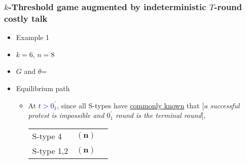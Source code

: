 \documentclass[9pt,handout]{beamer}
\begin{document}
\begin{frame}
  \frametitle{$k$-Threshold game augmented by indeterministic $T$-round costly talk}

\begin{itemize}
\item Example 1
\item $k=6$, $n=8$
\item $G$ and $\theta$=
\begin{center}
\end{center}
\end{itemize}

\begin{itemize}
\item Equilibrium path
\begin{itemize}
\item 
{
At \textcolor{blue}{$t>0^{'}_1$}, since all S-types have \underline{commonly known} that \alert{[}\textit{a successful protest is impossible and $0^{'}_1$ round is the terminal round}\alert{]},
\begin{table}[h]
\begin{tabular}{ll l}
S-type 4 & $({\textbf{n}})$\\
S-type 1,2 & $({\textbf{n}})$
\end{tabular}
\end{table}
}

\end{itemize}
\end{itemize}

\end{frame}
\end{document}
